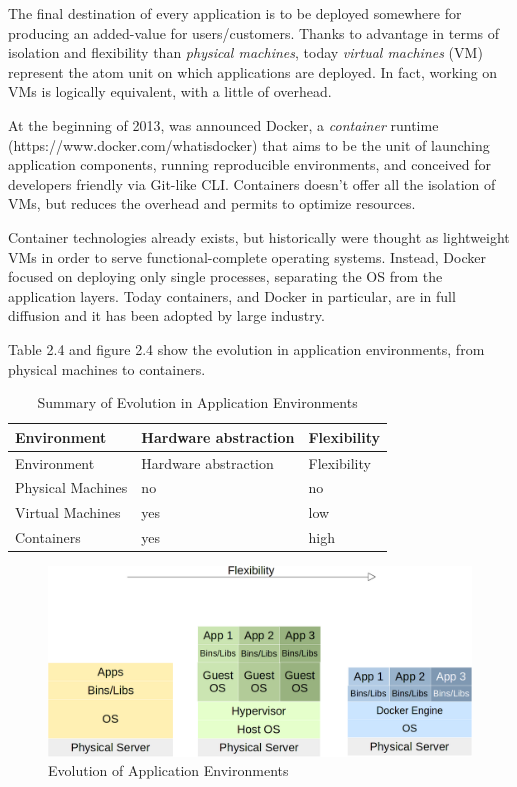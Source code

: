 The final destination of every application is to be deployed somewhere
for producing an added-value for users/customers. Thanks to advantage in
terms of isolation and flexibility than \textit{physical machines}, today
\textit{virtual machines} (VM) represent the atom unit on which
applications are deployed. In fact, working on VMs is logically
equivalent, with a little of overhead.

At the beginning of 2013, was announced Docker, a \textit{container}
runtime (https://www.docker.com/whatisdocker) that aims to be the unit
of launching application components, running reproducible environments,
and conceived for developers friendly via Git-like CLI. Containers
doesn't offer all the isolation of VMs, but reduces the overhead and
permits to optimize resources.

Container technologies already exists, but historically were thought as
lightweight VMs in order to serve functional-complete operating systems.
Instead, Docker focused on deploying only single processes, separating
the OS from the application layers. Today containers, and Docker in
particular, are in full diffusion and it has been adopted by large
industry.

Table 2.4 and figure 2.4 show the evolution in application environments, from physical machines to containers.

\begin{longtable}[c]{@{}lll@{}}
\caption{Summary of Evolution in Application
Environments}\tabularnewline
\toprule
Environment & Hardware abstraction & Flexibility\tabularnewline
\midrule
\endfirsthead
\toprule
Environment & Hardware abstraction & Flexibility\tabularnewline
\midrule
\endhead
Physical Machines & no & no\tabularnewline
Virtual Machines & yes & low\tabularnewline
Containers & yes & high\tabularnewline
\bottomrule
\end{longtable}

\begin{figure}[htbp]
\centering
\includegraphics{media/ch2-containers.png}
\caption{Evolution of Application Environments}
\end{figure}

